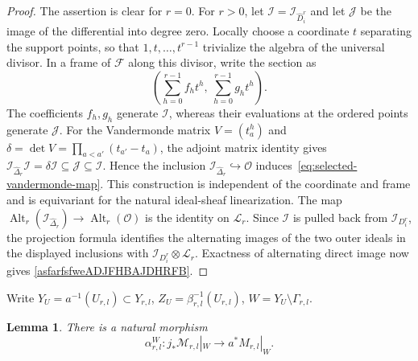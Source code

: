 \documentclass[11pt,letterpaper]{amsart}
\theoremstyle{plain}
\newtheorem{lemma}[theorem]{Lemma}
\theoremstyle{definition}
\theoremstyle{remark}
\numberwithin{equation}{section}
\begin{document}
\begin{proof}
The assertion is clear for $r=0$. For $r>0$, let
$\mathcal I=\mathcal I_{\widehat D_i^r}$ and let $\mathcal J$ be the
image of the differential into degree zero.
Locally choose a coordinate $t$ separating the support points, so
that $1,t,\ldots,t^{r-1}$ trivialize the algebra of the universal
divisor. In a frame of $\mathcal F$ along this divisor, write the
section as
\[
 \left(\sum_{h=0}^{r-1}f_ht^h,\ \sum_{h=0}^{r-1}g_ht^h\right).
\]
The coefficients $f_h,g_h$ generate $\mathcal I$, whereas their evaluations
at the ordered points generate $\mathcal J$. For the Vandermonde
matrix $V=(t_a^h)$ and
$\delta=\det V=\prod_{a<a'}(t_{a'}-t_a)$, the adjoint matrix identity gives
$
 \mathcal I_{\widehat\Delta_r}\mathcal I
       =\delta\mathcal I\subseteq\mathcal J\subseteq\mathcal I
$.
Hence the inclusion $\mathcal I_{\widehat\Delta_r}\hookrightarrow\mathcal O$
induces~\eqref{eq:selected-vandermonde-map}. This construction is
independent of the coordinate and frame and is equivariant for
the natural ideal-sheaf linearization.
The map
$\operatorname{Alt}_r(\mathcal I_{\widehat\Delta_r})
 \to\operatorname{Alt}_r(\mathcal O)$ is the identity on
$\mathscr L_r$. Since $\mathcal I$ is pulled back from
$\mathcal I_{D_i^r}$, the projection formula identifies the
alternating images of the two outer ideals in the displayed
inclusions with $\mathcal I_{D_i^r}\otimes\mathscr L_r$.
Exactness of alternating direct image now gives
\eqref{asfarfsfweADJFHBAJDHRFB}.
\end{proof}




Write
$Y_U=a^{-1}(U_{r,l})\subset Y_{r,l}$,
$Z_U=\beta_{r,l}^{-1}(U_{r,l})$,
$W=Y_U\setminus\Gamma_{r,l}$.

\begin{lemma}
There is a natural morphism
\begin{equation}\label{eq:kappa-fixed-splitting}
 \alpha^W_{r,l}:j_*\mathscr M_{r,l}|_W\longrightarrow a^*M_{r,l}|_W.
\end{equation}
\end{lemma}
\end{document}
